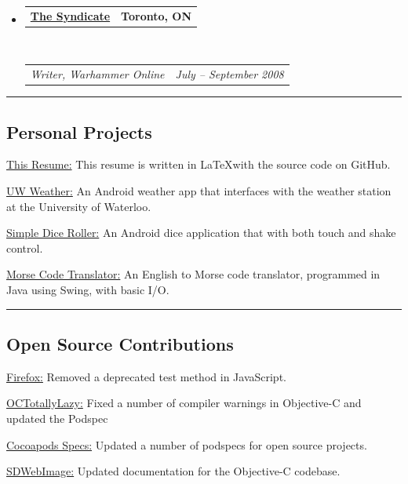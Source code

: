 \documentclass[10pt,letterpaper]{article}
\makeatletter
\newenvironment{indentsection}[1]%
{\begin{list}{}%
	{\setlength{\leftmargin}{#1}}%
	\item[]%
}
{\end{list}}
\newcommand{\headerrow}[2]
{\begin{tabular*}{\linewidth}{l@{\extracolsep{\fill}}r}
	#1 &
	#2 \\
\end{tabular*}}
\makeatother
\begin{document}
\begin{itemize}
	\item
	\headerrow
		{\textbf{\href{https://llts.org}{The Syndicate}}}
		{\textbf{Toronto, ON}}
	\\
	\headerrow
		{\emph{Writer, Warhammer Online}}
		{\emph{July -- September 2008}}

\end{itemize}

\hrule
\vspace{-0.4em}
\subsection*{Personal Projects}
	\begin{indentsection}{\parindent}
	\begin{description*}
		\item[\href{https://github.com/kapin/resume}{This Resume:}] This resume is written in \LaTeX with the source code on GitHub.
		\item[\href{https://github.com/Kapin/Waterloo-Weather}{UW Weather:}] An Android weather app that interfaces with the weather station at the University of Waterloo.
		\item[\href{https://github.com/Kapin/Dice-Roller}{Simple Dice Roller:}] An Android dice application that with both touch and shake control.	
		\item[\href{https://github.com/Kapin/Morse-Code-Translator}{Morse Code Translator:}] An English to Morse code translator, programmed in Java using Swing, with basic I/O.
	\end{description*}
	\end{indentsection}

\hrule
\vspace{-0.4em}
\subsection*{Open Source Contributions}
	\begin{indentsection}{\parindent}
	\begin{description*}
		\item[\href{https://mozilla.org}{Firefox:}] Removed a deprecated test method in JavaScript.
		\item[\href{https://github.com/stuartervine/octotallylazy}{OCTotallyLazy:}] Fixed a number of compiler warnings in Objective-C and updated the Podspec
		\item[\href{https://github.com/CocoaPods/Specs}{Cocoapods Specs:}]  Updated a number of podspecs for open source projects.	
		\item[\href{https://github.com/rs/sdwebimage}{SDWebImage:}] Updated documentation for the Objective-C codebase.
	\end{description*}
	\end{indentsection}
\end{document}
